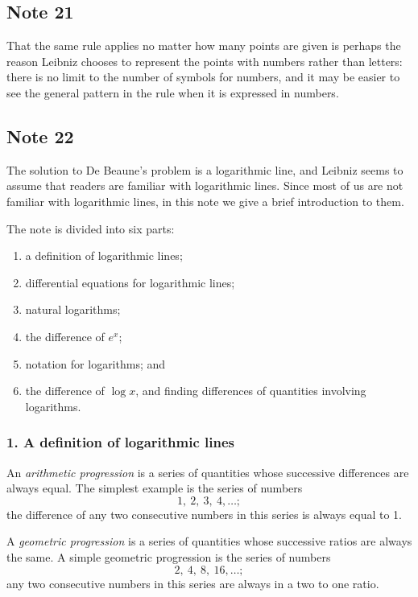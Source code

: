 \documentclass[polutonikogreek,english,twoside,openright]{article}
\begin{document}
\subsection*{Note 21}
\label{cnm21}

That the same rule applies no matter how many points are given is
perhaps the reason Leibniz chooses to represent the points with
numbers rather than letters: there is no limit to the number of
symbols for numbers, and it may be easier to see the general pattern
in the rule when it is expressed in numbers.

\subsection*{Note 22}
\label{bdebeaune}
\label{cnm22}
 
The solution to De Beaune's problem is a logarithmic line, and Leibniz
seems to assume that readers are familiar with logarithmic lines.
Since most of us are not familiar with logarithmic lines, in this note
we give a brief introduction to them.

The note is divided into six
parts:
\begin{enumerate}
\itemsep0em
\item a definition of logarithmic lines;
\item differential equations for logarithmic lines;
\item natural logarithms;
\item the difference of $e^x$;
\item notation for logarithms; and
\item the difference of $\log x$, and finding differences of quantities involving logarithms.
\end{enumerate}

\subsubsection*{1. A definition of logarithmic lines}

An {\em arithmetic progression} is a series of quantities whose
successive differences are always equal.  The simplest example is the
series of numbers
$$1,\ 2,\ 3,\ 4, \ldots;$$
the difference of any two consecutive numbers in this series is always equal to 1.

A {\em geometric progression} is a series of quantities whose
successive ratios are always the same.  A simple geometric progression
is the series of numbers
$$2,\ 4,\  8,\ 16, \ldots;$$
any two consecutive numbers in this series are always in a two to one ratio.
\end{document}

